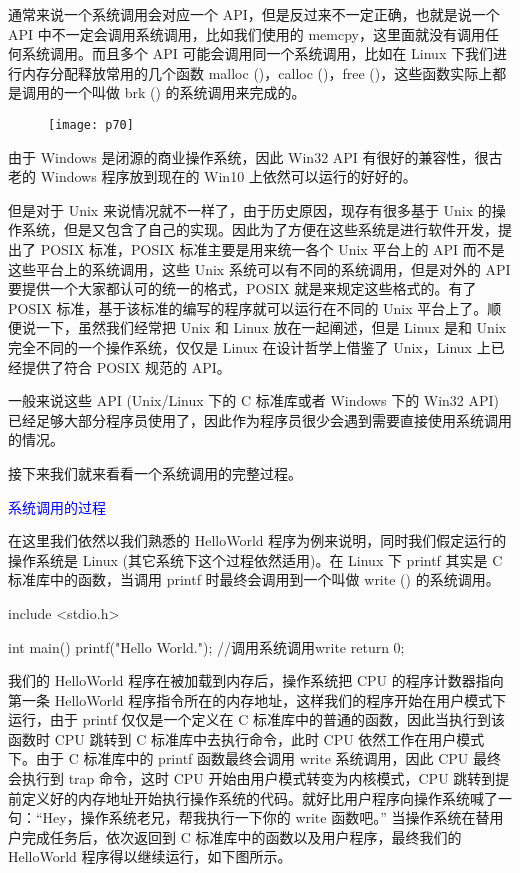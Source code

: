 \documentclass[utf8]{book}
\begin{document}
	通常来说一个系统调用会对应一个 API，但是反过来不一定正确，也就是说一个 API 中不一定会调用系统调用，比如我们使用的 memcpy，这里面就没有调用任何系统调用。而且多个 API 可能会调用同一个系统调用，比如在 Linux 下我们进行内存分配释放常用的几个函数 malloc ()，calloc ()，free ()，这些函数实际上都是调用的一个叫做 brk () 的系统调用来完成的。
	
	\begin{figure}[H]
		\centering
		\texttt{[image: p70]}
	\end{figure}

由于 Windows 是闭源的商业操作系统，因此 Win32 API 有很好的兼容性，很古老的 Windows 程序放到现在的 Win10 上依然可以运行的好好的。

但是对于 Unix 来说情况就不一样了，由于历史原因，现存有很多基于 Unix 的操作系统，但是又包含了自己的实现。因此为了方便在这些系统是进行软件开发，提出了 POSIX 标准，POSIX 标准主要是用来统一各个 Unix 平台上的 API 而不是这些平台上的系统调用，这些 Unix 系统可以有不同的系统调用，但是对外的 API 要提供一个大家都认可的统一的格式，POSIX 就是来规定这些格式的。有了 POSIX 标准，基于该标准的编写的程序就可以运行在不同的 Unix 平台上了。顺便说一下，虽然我们经常把 Unix 和 Linux 放在一起阐述，但是 Linux 是和 Unix 完全不同的一个操作系统，仅仅是 Linux 在设计哲学上借鉴了 Unix，Linux 上已经提供了符合 POSIX 规范的 API。

一般来说这些 API (Unix/Linux 下的 C 标准库或者 Windows 下的 Win32 API) 已经足够大部分程序员使用了，因此作为程序员很少会遇到需要直接使用系统调用的情况。

接下来我们就来看看一个系统调用的完整过程。


	
	\textcolor{blue}{系统调用的过程}
	
	
	在这里我们依然以我们熟悉的 HelloWorld 程序为例来说明，同时我们假定运行的操作系统是 Linux (其它系统下这个过程依然适用)。在 Linux 下 printf 其实是 C 标准库中的函数，当调用 printf 时最终会调用到一个叫做 write () 的系统调用。
	
	
	
	include <stdio.h>
	
	int main(){
		printf("Hello World."); //调用系统调用write
		return 0;
	}


我们的 HelloWorld 程序在被加载到内存后，操作系统把 CPU 的程序计数器指向第一条 HelloWorld 程序指令所在的内存地址，这样我们的程序开始在用户模式下运行，由于 printf 仅仅是一个定义在 C 标准库中的普通的函数，因此当执行到该函数时 CPU 跳转到 C 标准库中去执行命令，此时 CPU 依然工作在用户模式下。由于 C 标准库中的 printf 函数最终会调用 write 系统调用，因此 CPU 最终会执行到 trap 命令，这时 CPU 开始由用户模式转变为内核模式，CPU 跳转到提前定义好的内存地址开始执行操作系统的代码。就好比用户程序向操作系统喊了一句：“Hey，操作系统老兄，帮我执行一下你的 write 函数吧。” 当操作系统在替用户完成任务后，依次返回到 C 标准库中的函数以及用户程序，最终我们的 HelloWorld 程序得以继续运行，如下图所示。
\end{document}
